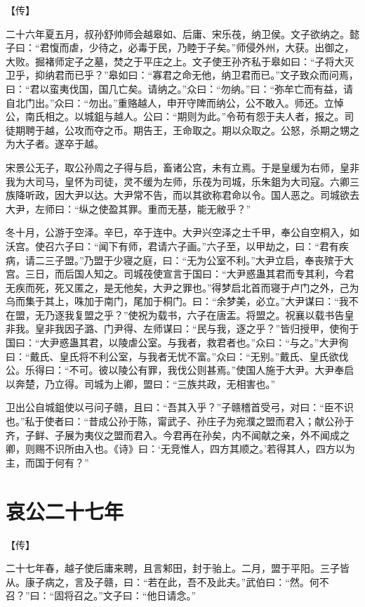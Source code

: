 \documentclass[a4paper,12pt,UTF8,twoside]{ctexbook}
\begin{document}
【传】

二十六年夏五月，叔孙舒帅师会越皋如、后庸、宋乐茷，纳卫侯。文子欲纳之。懿子曰：“君愎而虐，少待之，必毒于民，乃睦于子矣。”师侵外州，大获。出御之，大败。掘褚师定子之墓，焚之于平庄之上。文子使王孙齐私于皋如曰：“子将大灭卫乎，抑纳君而已乎？”皋如曰：“寡君之命无他，纳卫君而已。”文子致众而问焉，曰：“君以蛮夷伐国，国几亡矣。请纳之。”众曰：“勿纳。”曰：“弥牟亡而有益，请自北门出。”众曰：“勿出。”重赂越人，申开守陴而纳公，公不敢入。师还。立悼公，南氏相之。以城鉏与越人。公曰：“期则为此。”令苟有怨于夫人者，报之。司徒期聘于越，公攻而夺之币。期告王，王命取之。期以众取之。公怒，杀期之甥之为大子者。遂卒于越。

宋景公无子，取公孙周之子得与启，畜诸公宫，未有立焉。于是皇缓为右师，皇非我为大司马，皇怀为司徒，灵不缓为左师，乐茷为司城，乐朱鉏为大司寇。六卿三族降听政，因大尹以达。大尹常不告，而以其欲称君命以令。国人恶之。司城欲去大尹，左师曰：“纵之使盈其罪。重而无基，能无敝乎？”

冬十月，公游于空泽。辛巳，卒于连中。大尹兴空泽之士千甲，奉公自空桐入，如沃宫。使召六子曰：“闻下有师，君请六子画。”六子至，以甲劫之，曰：“君有疾病，请二三子盟。”乃盟于少寝之庭，曰：“无为公室不利。”大尹立启，奉丧殡于大宫。三日，而后国人知之。司城茷使宣言于国曰：“大尹惑蛊其君而专其利，今君无疾而死，死又匿之，是无他矣，大尹之罪也。”得梦启北首而寝于卢门之外，己为乌而集于其上，咮加于南门，尾加于桐门。曰：“余梦美，必立。”大尹谋曰：“我不在盟，无乃逐我复盟之乎？”使祝为载书，六子在唐盂。将盟之。祝襄以载书告皇非我。皇非我因子潞、门尹得、左师谋曰：“民与我，逐之乎？”皆归授甲，使徇于国曰：“大尹惑蛊其君，以陵虐公室。与我者，救君者也。”众曰：“与之。”大尹徇曰：“戴氏、皇氏将不利公室，与我者无忧不富。”众曰：“无别。”戴氏、皇氏欲伐公。乐得曰：“不可。彼以陵公有罪，我伐公则甚焉。”使国人施于大尹。大尹奉启以奔楚，乃立得。司城为上卿，盟曰：“三族共政，无相害也。”

卫出公自城鉏使以弓问子赣，且曰：“吾其入乎？”子赣稽首受弓，对曰：“臣不识也。”私于使者曰：“昔成公孙于陈，甯武子、孙庄子为宛濮之盟而君入；献公孙于齐，子鲜、子展为夷仪之盟而君入。今君再在孙矣，内不闻献之亲，外不闻成之卿，则赐不识所由入也。《诗》曰：‘无竞惟人，四方其顺之。’若得其人，四方以为主，而国于何有？”


\section{哀公二十七年}

【传】

二十七年春，越子使后庸来聘，且言邾田，封于骀上。二月，盟于平阳。三子皆从。康子病之，言及子赣，曰：“若在此，吾不及此夫。”武伯曰：“然。何不召？”曰：“固将召之。”文子曰：“他日请念。”
\end{document}
